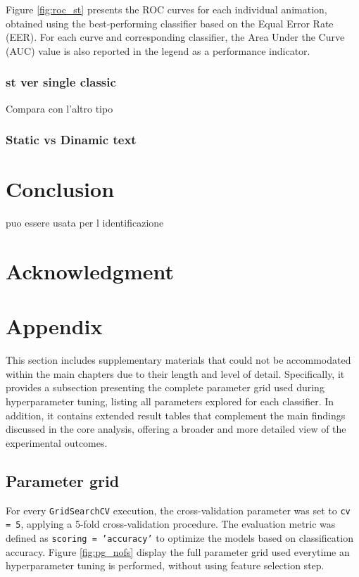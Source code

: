 \documentclass{article}
\begin{document}
Figure \ref{fig:roc_st} presents the ROC curves for each individual animation, obtained using the best-performing classifier based on the Equal Error Rate (EER).
For each curve and corresponding classifier, the Area Under the Curve (AUC) value is also reported in the legend as a performance indicator.

\clearpage

\subsubsection{st ver single classic}
\label{subsec:s_vs_cst}
Compara con l'altro tipo

\subsubsection{Static vs Dinamic text}
\label{subsec:s_vs_d}



\newpage
\section{Conclusion}
puo essere usata per l identificazione
\noindent
\section{Acknowledgment}

\section{Appendix}

This section includes supplementary materials that could not be accommodated within the main chapters due to their length and level of detail. 
Specifically, it provides a subsection presenting the complete parameter grid used during hyperparameter tuning, listing all parameters explored for each classifier. 
In addition, it contains extended result tables that complement the main findings discussed in the core analysis, offering a broader and more detailed view of the experimental outcomes. 

\subsection{Parameter grid}

For every \texttt{GridSearchCV} execution, the cross-validation parameter was set to \texttt{cv = 5}, applying a 5-fold cross-validation procedure.
The evaluation metric was defined as \texttt{scoring = 'accuracy'} to optimize the models based on classification accuracy.
Figure \ref{fig:pg_nofs} display the full parameter grid used everytime an hyperparameter tuning is performed, without using feature selection step.
\end{document}
